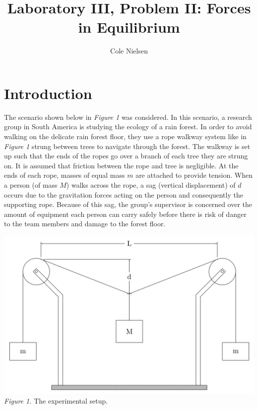 \documentclass[12pt,letterpaper]{article}
\begin{document}
\title{Laboratory III, Problem II: Forces in Equilibrium}
\author[]{Cole Nielsen}
\date{}
\pdfpagewidth 8.5in
\pdfpageheight 11in
%
%
\maketitle
%

\section{Introduction}
The scenario shown below in \textit{Figure 1} was considered. In this scenario, a research group in South America is studying the ecology of a rain forest. In order to avoid walking on the delicate rain forest floor, they use a rope walkway system like in \textit{Figure 1} strung between trees to navigate through the forest. The walkway is set up such that the ends of the ropes go over a branch of each tree they are strung on. It is assumed that friction between the rope and tree is negligible. At the ends of each rope, masses of equal mass \(m\) are attached to provide tension. When a person (of mass \(M\)) walks across the rope, a sag (vertical displacement) of \(d\) occurs due to the gravitation forces acting on the person and consequently the supporting rope. Because of this sag, the group's supervisor is concerned over the amount of equipment each person can carry safely before there is risk of danger to the team members and damage to the forest floor.
\newline
\begin{center}
\hspace{.4in}
\includegraphics[scale=0.15]{lr3.png}
\newline\newline
\textit{Figure 1.} The experimental setup.
\end{center}%
\end{document}
